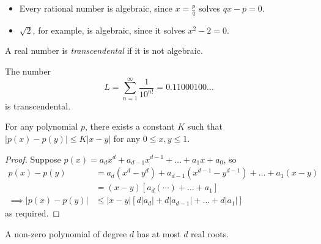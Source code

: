 \documentclass{../../template/note}
\begin{document}
    \begin{example}
        \begin{itemize}
            \item Every rational number is algebraic, since \(x = \frac{p}{q}\) solves \(qx - p = 0\).
            \item \(\sqrt 2\), for example, is algebraic, since it solves \(x^2-2=0\).
        \end{itemize}
    \end{example}
    
    \begin{definition}
        A real number is \emph{transcendental} if it is not algebraic.
    \end{definition}
    
    \begin{theorem}[Liouville]
        The number
        \[
            L = \sum_{n=1}^\infty \frac{1}{10^{n!}} = 0.11000100\dots
        \]
        is transcendental.
    \end{theorem}
    
    \begin{lemma}
        For any polynomial \(p\), there exists a constant \(K\) such that \(|p(x)-p(y)| \leq K|x-y|\) for any \(0 \leq x, y \leq 1\).
        \label{liouville-lemma-1}
    \end{lemma}
    
    \begin{proof}
        Suppose \(p(x) = a_dx^d + a_{d-1}x^{d-1} + \dots + a_1 x + a_0\), so
        \begin{align*}
            p(x)-p(y) &= a_d(x^d-y^d) + a_{d-1}(x^{d-1}-y^{d-1}) + \dots + a_1(x -y) \\
            &= (x-y)[a_d(\cdots) + \dots + a_1] \\
            \implies |p(x)-p(y)| &\leq |x-y|\left[d|a_d| + d|a_{d-1}| + \dots + d|a_1|\right]
        \end{align*}
        as required.
    \end{proof}
    
    \begin{lemma}
        A non-zero polynomial of degree \(d\) has at most \(d\) real roots.
        \label{liouville-lemma-2}
    \end{lemma}

    
\end{document}
